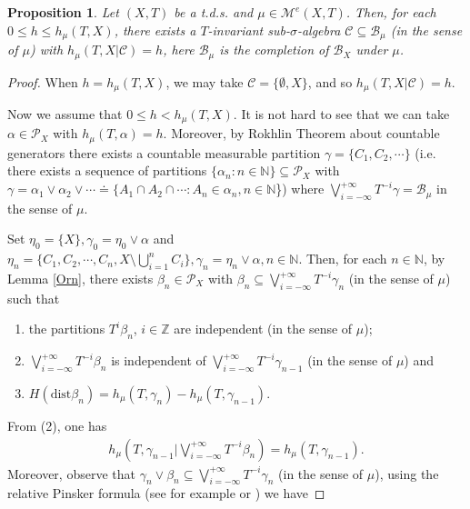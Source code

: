 \documentclass[12pt]{amsart}
\newtheorem{prop}[thm]{Proposition}
\theoremstyle{definition} \theoremstyle{question}
\numberwithin{equation}{section}
\begin{document}
\begin{prop} \label{Huang}
Let $(X, T)$ be a t.d.s. and $\mu\in \mathcal{M}^e (X, T)$. Then,
for each $0\le h\le h_\mu (T, X)$, there exists a $T$-invariant
sub-$\sigma$-algebra $\mathcal{C}\subseteq \mathcal{B}_\mu$ (in the
sense of $\mu$) with $h_\mu (T, X| \mathcal{C})= h$, here
$\mathcal{B}_\mu$ is the completion of $\mathcal{B}_X$ under $\mu$.
\end{prop}
\begin{proof}
When $h= h_\mu (T, X)$, we may take $\mathcal{C}= \{\emptyset, X\}$,
and so $h_\mu (T, X| \mathcal{C})= h$.

Now we assume that $0\le h< h_\mu (T, X)$. It is not hard to see
that we can take $\alpha\in \mathcal{P}_X$ with $h_\mu (T, \alpha)=
h$. Moreover, by Rokhlin Theorem about countable generators
\cite[10.13]{Rok} there exists a countable measurable partition $\gamma=
\{C_1, C_2, \cdots\}$ (i.e. there exists a sequence of partitions
$\{\alpha_n: n\in {\mathbb N}\}\subseteq \mathcal{P}_X$ with $\gamma=
\alpha_1\vee \alpha_2\vee \cdots\doteq \{A_1\cap A_2\cap \cdots:
A_n\in \alpha_n, n\in {\mathbb N}$\}) where $\bigvee_{i= - \infty}^{+ \infty}
T^{- i} \gamma= \mathcal{B}_\mu$ in the sense of $\mu$.

Set $\eta_0= \{X\}, \gamma_0= \eta_0\vee \alpha$ and $\eta_n= \{C_1,
C_2, \cdots, C_n, X\setminus \bigcup_{i= 1}^n C_i\}, \gamma_n=
\eta_n\vee \alpha, n\in \mathbb{N}$. Then, for each $n\in
\mathbb{N}$, by Lemma \ref{Orn}, there exists $\beta_n\in
\mathcal{P}_X$ with $\beta_n\subseteq \bigvee_{i= - \infty}^{+
\infty} T^{- i} \gamma_n$ (in the sense of $\mu$) such that
\begin{enumerate}

\item the partitions $T^i \beta_n$, $i\in \mathbb{Z}$ are
independent (in the sense of $\mu$);

\item $\bigvee_{i= - \infty}^{+ \infty} T^{- i} \beta_n$ is independent of
$\bigvee_{i= - \infty}^{+ \infty} T^{- i} \gamma_{n- 1}$ (in the
sense of $\mu$) and

\item $H (\text{dist} \beta_n)= h_\mu (T, \gamma_n)- h_\mu (T, \gamma_{n- 1})$.
\end{enumerate}
From (2), one has
\begin{eqnarray}\label{eq-ke1}
h_\mu (T, \gamma_{n-1}| \bigvee_{i= - \infty}^{+ \infty} T^{- i}
\beta_n)= h_\mu (T, \gamma_{n- 1}).
\end{eqnarray}
Moreover, observe that $\gamma_n\vee \beta_n\subseteq \bigvee_{i= -
\infty}^{+ \infty} T^{- i} \gamma_n$ (in the sense of $\mu$), using
the relative Pinsker formula (see for example \cite[Lemma 1.1]{GTW}
or \cite[Theorem 3.3]{Z}) we have


\end{proof}
\end{document}
